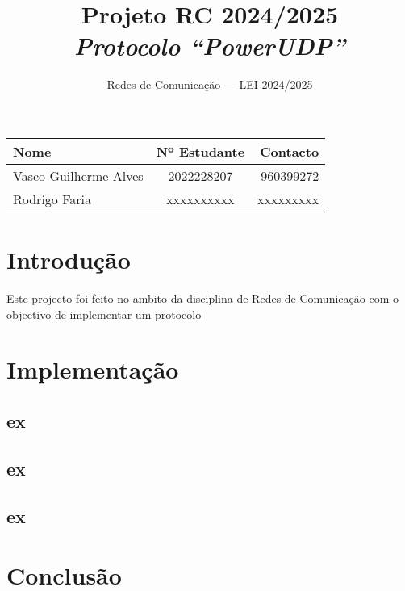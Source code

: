 \documentclass[a4paper, 11pt]{article}
\title{\Huge Projeto RC 2024/2025\\
        \it \huge Protocolo ``PowerUDP''
}
\author{Redes de Comunicação --- LEI 2024/2025}
\date{}
\begin{document}
\maketitle
\begin{center}
    \begin{tabularx}{0.8\textwidth}{Xcr}
    \bf Nome  & \bf Nº Estudante & \bf Contacto  \\\midrule
    Vasco Guilherme Alves & 2022228207 & 960399272\\
    Rodrigo Faria & xxxxxxxxxx & xxxxxxxxx \\ 
    \end{tabularx}
\end{center}

\tableofcontents

\newpage
\section{Introdução}

Este projecto foi feito no ambito da disciplina de Redes de Comunicação com o objectivo de implementar um protocolo 

\section{Implementação}
\subsection{ex}
\subsection{ex}
\subsection{ex}

\section{Conclusão}
\end{document}
